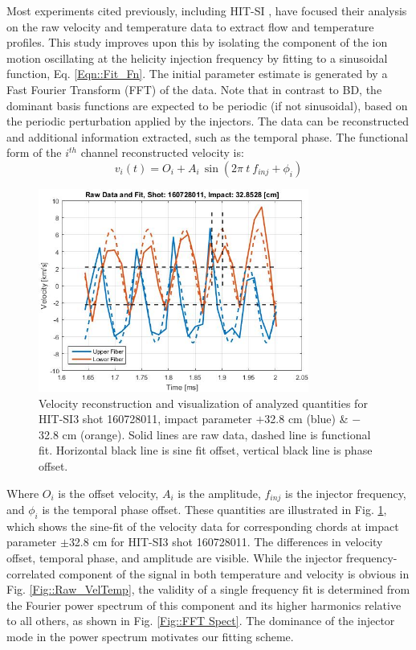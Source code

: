 	Most experiments cited previously, including HIT-SI \cite{Hossack_HitSi3}, have focused their analysis on the raw velocity and temperature data to extract flow and temperature profiles. This study improves upon this by isolating the component of the ion motion oscillating at the helicity injection frequency by fitting to a sinusoidal function, Eq. \ref{Eqn::Fit_Fn}. The initial parameter estimate is generated by a Fast Fourier Transform (FFT) of the data. Note that in contrast to BD, the dominant basis functions are expected to be periodic (if not sinusoidal), based on the periodic perturbation applied by the injectors. The data can be reconstructed and additional information extracted, such as the temporal phase. The functional form of the $i^{th}$ channel reconstructed velocity is:
	\begin{equation}\label{Eqn::Fit_Fn}
	v_i(t)=O_i+A_i\,\mathrm{\sin}(2{\pi}\:t\:f_{inj}+\phi_i)
	\end{equation}
	\begin{figure}
		\includegraphics[width=3.5in]{ReconstExplain}\caption{Velocity reconstruction and visualization of analyzed quantities for HIT-SI3 shot 160728011, impact parameter $+$32.8 cm (blue) \& $-$32.8 cm (orange). Solid lines are raw data, dashed line is functional fit. Horizontal black line is sine fit offset, vertical black line is phase offset.}\label{Fig::Reconst Explain}
	\end{figure}
	Where $O_i$ is the offset velocity, $A_i$ is the amplitude, $f_{inj}$ is the injector frequency, and $\phi_i$ is the temporal phase offset. These quantities are illustrated in Fig. \ref{Fig::Reconst Explain}, which shows the sine-fit of the velocity data for corresponding chords at impact parameter $\pm$32.8 cm for HIT-SI3 shot 160728011. The differences in velocity offset, temporal phase, and amplitude are visible. While the injector frequency-correlated component of the signal in both temperature and velocity is obvious in Fig. \ref{Fig::Raw_VelTemp}, the validity of a single frequency fit is determined from the Fourier power spectrum of this component and its higher harmonics relative to all others, as shown in Fig. \ref{Fig::FFT Spect}. The dominance of the injector mode in the power spectrum motivates our fitting scheme.
